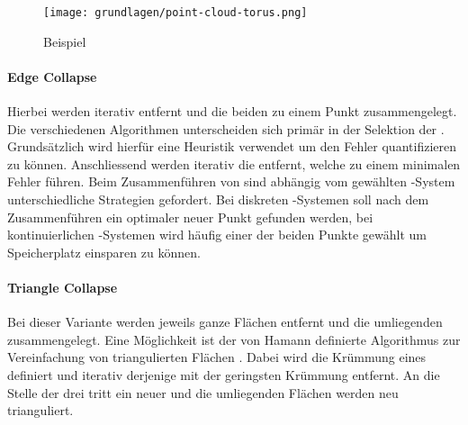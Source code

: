 \begin{figure}[H]
  \centering
  \texttt{[image: grundlagen/point-cloud-torus.png]}
  \caption{Beispiel  \cite{pointCloudTorus}}
  \label{fig:pointCloudTorus}
\end{figure}

\paragraph{Edge Collapse}
Hierbei werden iterativ  entfernt und die beiden  zu einem Punkt zusammengelegt.
Die verschiedenen Algorithmen unterscheiden sich primär in der Selektion der . Grundsätzlich wird hierfür eine Heuristik verwendet um den Fehler quantifizieren zu können. Anschliessend werden iterativ die  entfernt, welche zu einem minimalen Fehler führen. Beim Zusammenführen von  sind abhängig vom gewählten -System unterschiedliche Strategien gefordert. Bei diskreten -Systemen soll nach dem Zusammenführen ein optimaler neuer Punkt gefunden werden, bei kontinuierlichen -Systemen wird häufig einer der beiden Punkte gewählt um Speicherplatz einsparen zu können.

\paragraph{Triangle Collapse}
Bei dieser Variante werden jeweils ganze Flächen entfernt und die umliegenden  zusammengelegt. Eine Möglichkeit ist der von Hamann definierte Algorithmus zur Vereinfachung von triangulierten Flächen \cite{triangleCollapseAlgorithm}. Dabei wird die Krümmung eines  definiert und iterativ derjenige  mit der geringsten Krümmung entfernt. An die Stelle der drei  tritt ein neuer  und die umliegenden Flächen werden neu trianguliert.
